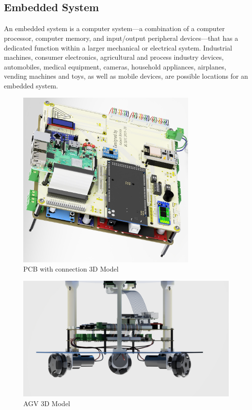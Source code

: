 \newpage

\subsection{Embedded System}

\paragraph{} An embedded system is a computer system—a combination of a computer processor, computer memory, and input/output peripheral devices—that has a dedicated function within a larger mechanical or electrical system. Industrial machines, consumer electronics, agricultural and process industry devices, automobiles, medical equipment, cameras, household appliances, airplanes, vending machines and toys, as well as mobile devices, are possible locations for an embedded system.


\begin{figure}[H]
\centering
\includegraphics[width = 9cm]{project/images/full circuit 01.jpg}
\caption{PCB with connection 3D Model}
\end{figure}

\begin{figure}[H]
\centering
\includegraphics[width = 13cm]{project/images/full circuit 02.jpg}
\caption{AGV 3D Model}
\end{figure}

